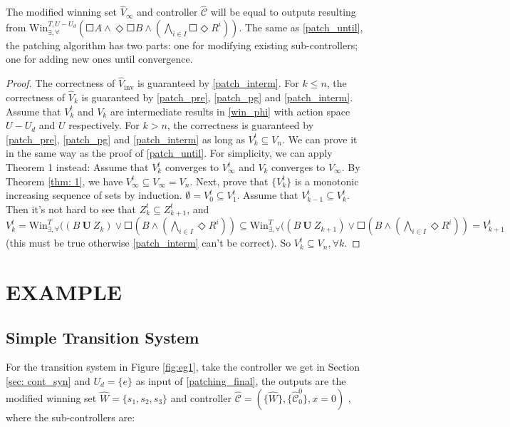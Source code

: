 The modified winning set $ \widehat{V}_{\infty} $ and controller $ \widehat{\mathcal{C}} $ will be equal to outputs resulting from $ \text{Win}_{\exists, \forall}^{T,U-U_d}\left(\Square A \wedge \Diamond \Square B \wedge \left( \bigwedge_{i\in I} \Square \Diamond R^i\right)\right) $. The same as \eqref{patch_until}, the patching algorithm has two parts: one for modifying existing sub-controllers; one for adding new ones until convergence.

\begin{proof}
	The correctness of $ \widehat{V}_{\text{inv}} $ is guaranteed by \eqref{patch_interm}.
	For $ k\leq n $, the correctness of $ \widehat{V}_{k} $ is guaranteed by \eqref{patch_pre}, \eqref{patch_pg} and \eqref{patch_interm}. Assume that $ V^t_k $ and $ V_k $ are intermediate results in \eqref{win_phi} with action space $ U-U_d $ and $ U $ respectively. For $ k > n$, the correctness is guaranteed by  \eqref{patch_pre}, \eqref{patch_pg} and \eqref{patch_interm} as long as $ V^t_{k} \subseteq V_n $. We can prove it in the same way as the proof of \eqref{patch_until}. For simplicity, we can apply Theorem 1 instead:  Assume that $ V_k^t $ converges to $ V_{\infty}^t $ and $ V_k $ converges to $ V_{\infty} $. By Theorem \ref{thm: 1}, we have $ V^t_{\infty}\subseteq V_{\infty} = V_n $. Next, prove that $ \{V^t_k\} $ is a monotonic increasing sequence of sets by induction. $ \emptyset = V^t_0 \subseteq V^t_1 $. Assume that $ V^t_{k-1}\subseteq V^t_{k}$. Then it's not hard to see that $ Z^t_k \subseteq Z^t_{k+1} $, and $ V^t_k = \text{Win}_{\exists,\forall}^{T} ((B \mathbf{\ U\ }Z_{k}) \vee \Square (B\wedge ( \bigwedge_{i\in I}\Diamond R^i))\subseteq \text{Win}_{\exists,\forall}^{T} ((B \mathbf{\ U\ }Z_{k+1}) \vee \Square (B\wedge ( \bigwedge_{i\in I}\Diamond R^i))=V^t_{k+1} $ (this must be true otherwise \eqref{patch_interm} can't be correct). So $ V^t_k \subseteq V_n, \forall k $. 
	
\end{proof}


\section{EXAMPLE}
\label{sec:example}
\subsection{Simple Transition System}
For the transition system in Figure \ref{fig:eg1}, take the controller we get in Section \ref{sec: cont_syn} and  $ U_d= \{e\} $ as input of \eqref{patching_final}, the outputs are the modified winning set $ \widehat{W}=\{s_1,s_2,s_3\} $ and controller $ \widehat{\mathcal{C}} = (\{\widehat{W}\},\{\widehat{\mathcal{C}}_0^0\},x=0) $ , where the sub-controllers are: 

